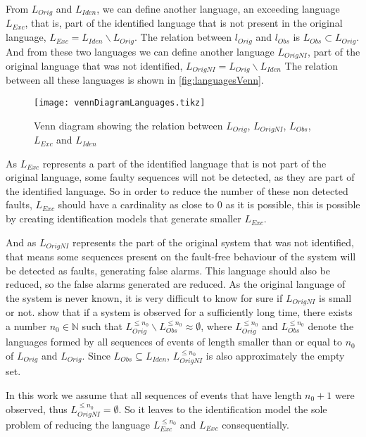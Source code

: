 From $L_{Orig}$ and $L_{Iden}$, we can define another language, an exceeding
language $L_{Exc}$, that is, part of the identified language that is not present in the
original language, $L_{Exc}=L_{Iden}\backslash L_{Orig}$.  The
relation between $l_{Orig}$ and $l_{Obs}$ is $L_{Obs} \subset L_{Orig}$. And from
these two languages we can define another language $L_{OrigNI}$, part of the
original language that was not identified, $L_{OrigNI}=L_{Orig}\backslash L_{Iden}$
The relation between all these languages is shown in \autoref{fig:languagesVenn}.

\usetikzlibrary{patterns}
\begin{figure}[H]
  \centering \texttt{[image: vennDiagramLanguages.tikz]}
  \caption{Venn diagram showing the relation between $L_{Orig}$, $L_{OrigNI}$,
    $L_{Obs}$, $L_{Exc}$ and $L_{Iden}$}
  \label{fig:languagesVenn}
\end{figure}
As $L_{Exc}$ represents a part of the identified language that is not part of
the original language, some faulty sequences will not be detected, as they are
part of the identified language. So in order to reduce the number of these non
detected faults, $L_{Exc}$ should have a cardinality as close to $0$ as it is
possible, this is possible by creating identification models that generate
smaller $L_{Exc}$.

And as $L_{OrigNI}$ represents the part of the original system that was not
identified, that means some sequences present on the fault-free behaviour of the
system will be detected as faults, generating false alarms. This language should
also be reduced, so the false alarms generated are reduced. As the original
language of the system is never known, it is very difficult to know for sure if
$L_{OrigNI}$ is small or not. \cite{klein2005fault} show that if a system is
observed for a sufficiently long time, there exists a number $n_0\in \mathbb{N}$
such that $L_{Orig}^{\leq n_0}\backslash L_{Obs}^{\leq n_0}\approx \emptyset$,
where $L_{Orig}^{\leq n_0}$ and $L_{Obs}^{\leq n_0}$ denote the languages formed
by all sequences of events of length smaller than or equal to $n_0$ of
$L_{Orig}$ and $L_{Orig}$. Since $L_{Obs}\subseteq L_{Iden}$, $L_{OrigNI}^{\leq
  n_0}$ is also approximately the empty set.

In this work we assume that all
sequences of events that have length $n_0+1$ were observed, thus
$L_{OrigNI}^{\leq n_0}=\emptyset$. So it leaves to the identification model the
sole problem of reducing the language $L_{Exc}^{\leq n_0}$ and $L_{Exc}$ consequentially.

